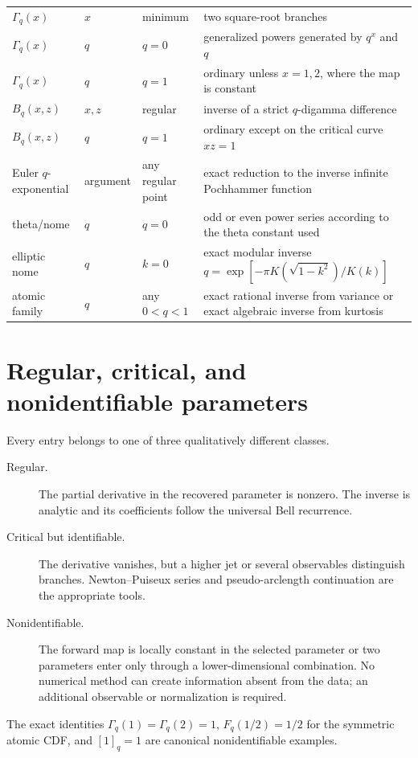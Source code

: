 \documentclass[11pt,letterpaper,oneside,openany]{book}
\theoremstyle{definition}
\theoremstyle{remark}
\begin{document}
\begin{longtable}{@{}p{}p{}p{}p{}@{}}
\(\Gamma_q(x)\) & \(x\) & minimum & two square-root branches\\
\(\Gamma_q(x)\) & \(q\) & \(q=0\) & generalized powers generated by
\(q^x\) and \(q\)\\
\(\Gamma_q(x)\) & \(q\) & \(q=1\) & ordinary unless \(x=1,2\), where the
map is constant\\
\(B_q(x,z)\) & \(x,z\) & regular & inverse of a strict \(q\)-digamma
difference\\
\(B_q(x,z)\) & \(q\) & \(q=1\) & ordinary except on the critical curve
\(xz=1\)\\
Euler \(q\)-exponential & argument & any regular point & exact reduction to the
inverse infinite Pochhammer function\\
theta/nome & \(q\) & \(q=0\) & odd or even power series according to the theta
constant used\\
elliptic nome & \(q\) & \(k=0\) & exact modular inverse
\(q=\exp[-\pi K(\sqrt{1-k^2})/K(k)]\)\\
atomic family & \(q\) & any \(0<q<1\) & exact rational inverse from variance or
exact algebraic inverse from kurtosis\\
\bottomrule
\end{longtable}

\section{Regular, critical, and nonidentifiable parameters}
Every entry belongs to one of three qualitatively different classes.
\begin{description}
\item[Regular.] The partial derivative in the recovered parameter is nonzero.
The inverse is analytic and its coefficients follow the universal Bell
recurrence.
\item[Critical but identifiable.] The derivative vanishes, but a higher jet or
several observables distinguish branches.  Newton--Puiseux series and
pseudo-arclength continuation are the appropriate tools.
\item[Nonidentifiable.] The forward map is locally constant in the selected
parameter or two parameters enter only through a lower-dimensional
combination.  No numerical method can create information absent from the data;
an additional observable or normalization is required.
\end{description}
The exact identities \(\Gamma_q(1)=\Gamma_q(2)=1\),
\(F_q(1/2)=1/2\) for the symmetric atomic CDF, and
\([1]_q=1\) are canonical nonidentifiable examples.
\end{document}

